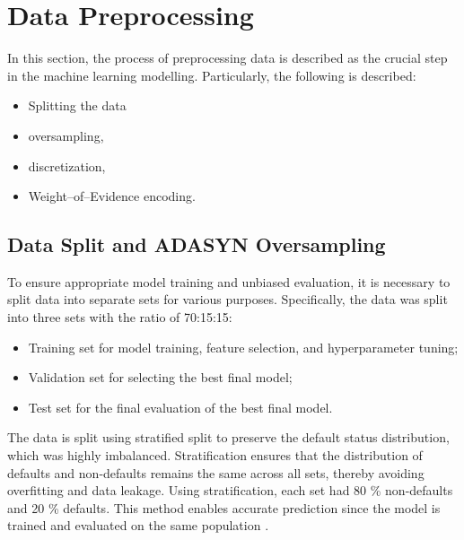 \section{Data Preprocessing}
In this section, the process of preprocessing data is described as the crucial step in the machine learning modelling. Particularly, the following is described:
\begin{itemize}\setlength\itemsep{0em}
    \item Splitting the data
    \item oversampling,
    \item discretization,
    \item Weight--of--Evidence encoding.
\end{itemize}


\subsection{Data Split and ADASYN Oversampling}
\label{subsec:data-split-ADASYN}

To ensure appropriate model training and unbiased evaluation, it is necessary to split data into separate sets for various purposes. Specifically, the data was split into three sets with the ratio of 70:15:15:
\begin{itemize}\setlength\itemsep{0em} 
    \item Training set for model training, feature selection, and hyperparameter tuning;
    \item Validation set for selecting the best final model;
    \item Test set for the final evaluation of the best final model.
\end{itemize}

The data is split using stratified split to preserve the default status distribution, which was highly imbalanced.
Stratification ensures that the distribution of defaults and non-defaults remains the same across all sets, thereby avoiding overfitting and data leakage. Using stratification, each set had 80 \% non-defaults and 20 \% defaults. This method enables accurate prediction since the model is trained and evaluated on the same population \citep{igareta2021strat}.

